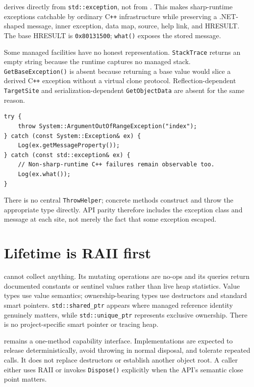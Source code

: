  derives directly from \texttt{std::exception}, not from
. This makes sharp-runtime exceptions catchable by ordinary C\texttt{++}
infrastructure while preserving a .NET-shaped message, inner exception, data map, source,
help link, and HRESULT. The base HRESULT is \texttt{0x80131500}; \texttt{what()} exposes the
stored message.

Some managed facilities have no honest representation. \texttt{StackTrace} returns an empty
string because the runtime captures no managed stack. \texttt{GetBaseException()} is absent
because returning a base value would slice a derived C\texttt{++} exception without a virtual
clone protocol. Reflection-dependent \texttt{TargetSite} and serialization-dependent
\texttt{GetObjectData} are absent for the same reason.

\begin{lstlisting}
try {
    throw System::ArgumentOutOfRangeException("index");
} catch (const System::Exception& ex) {
    Log(ex.getMessageProperty());
} catch (const std::exception& ex) {
    // Non-sharp-runtime C++ failures remain observable too.
    Log(ex.what());
}
\end{lstlisting}

There is no central \texttt{ThrowHelper}; concrete methods construct and throw the appropriate
type directly. API parity therefore includes the exception class and message at each site,
not merely the fact that some exception escaped.

\section{Lifetime is RAII first}

 cannot collect anything. Its mutating operations are no-ops and its
queries return documented constants or sentinel values rather than live heap statistics. Value
types use value semantics; ownership-bearing types use destructors and standard smart pointers.
\texttt{std::shared\_ptr} appears where managed reference identity genuinely matters, while
\texttt{std::unique\_ptr} represents exclusive ownership. There is no project-specific smart
pointer or tracing heap.

 remains a one-method capability interface. Implementations are
expected to release deterministically, avoid throwing in normal disposal, and tolerate repeated
calls. It does not replace destructors or establish another object root. A caller either uses
RAII or invokes \texttt{Dispose()} explicitly when the API's semantic close point matters.

